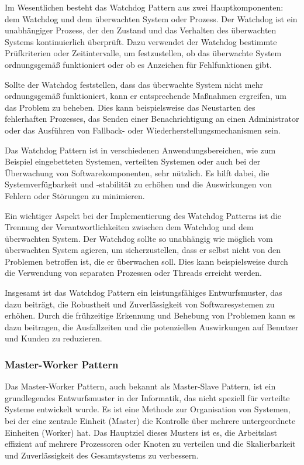 \documentclass[../vs-script-first-v01.tex]{subfiles}
\begin{document}
Im Wesentlichen besteht das Watchdog Pattern aus zwei Hauptkomponenten: dem Watchdog und dem überwachten System oder Prozess. Der Watchdog ist ein unabhängiger Prozess, der den Zustand und das Verhalten des überwachten Systems kontinuierlich überprüft. Dazu verwendet der Watchdog bestimmte Prüfkriterien oder Zeitintervalle, um festzustellen, ob das überwachte System ordnungsgemäß funktioniert oder ob es Anzeichen für Fehlfunktionen gibt.

Sollte der Watchdog feststellen, dass das überwachte System nicht mehr ordnungsgemäß funktioniert, kann er entsprechende Maßnahmen ergreifen, um das Problem zu beheben. Dies kann beispielsweise das Neustarten des fehlerhaften Prozesses, das Senden einer Benachrichtigung an einen Administrator oder das Ausführen von Fallback- oder Wiederherstellungsmechanismen sein.

Das Watchdog Pattern ist in verschiedenen Anwendungsbereichen, wie zum Beispiel eingebetteten Systemen, verteilten Systemen oder auch bei der Überwachung von Softwarekomponenten, sehr nützlich. Es hilft dabei, die Systemverfügbarkeit und -stabilität zu erhöhen und die Auswirkungen von Fehlern oder Störungen zu minimieren.

Ein wichtiger Aspekt bei der Implementierung des Watchdog Patterns ist die Trennung der Verantwortlichkeiten zwischen dem Watchdog und dem überwachten System. Der Watchdog sollte so unabhängig wie möglich vom überwachten System agieren, um sicherzustellen, dass er selbst nicht von den Problemen betroffen ist, die er überwachen soll. Dies kann beispielsweise durch die Verwendung von separaten Prozessen oder Threads erreicht werden.

Insgesamt ist das Watchdog Pattern ein leistungsfähiges Entwurfsmuster, das dazu beiträgt, die Robustheit und Zuverlässigkeit von Softwaresystemen zu erhöhen. Durch die frühzeitige Erkennung und Behebung von Problemen kann es dazu beitragen, die Ausfallzeiten und die potenziellen Auswirkungen auf Benutzer und Kunden zu reduzieren.

\subsubsection{Master-Worker Pattern}
Das Master-Worker Pattern, auch bekannt als Master-Slave Pattern, ist ein grundlegendes Entwurfsmuster in der Informatik, das nicht speziell für verteilte Systeme entwickelt wurde. Es ist eine Methode zur Organisation von Systemen, bei der eine zentrale Einheit (Master) die Kontrolle über mehrere untergeordnete Einheiten (Worker) hat. Das Hauptziel dieses Musters ist es, die Arbeitslast effizient auf mehrere Prozessoren oder Knoten zu verteilen und die Skalierbarkeit und Zuverlässigkeit des Gesamtsystems zu verbessern.
\end{document}
